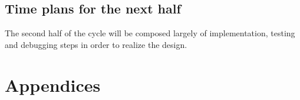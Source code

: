 \documentclass[paper=a4, fontsize=11pt,twoside]{scrartcl}		%
\begin{document}
\subsection{Time plans for the next half}
The second half of the cycle will be composed largely of implementation, testing and debugging steps in order to realize the design.

\clearpage

\section{Appendices}
\clearpage




\end{document}
